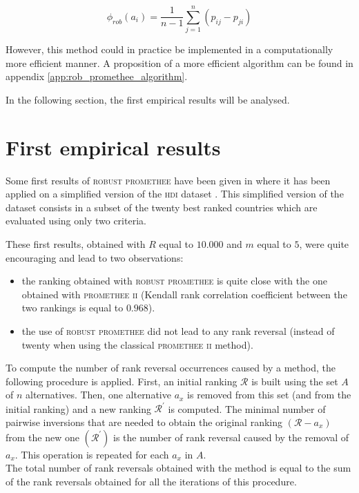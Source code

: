 \begin{equation}
    \phi_{rob}(a_i) = \frac{1}{n-1}\sum\limits^n_{j=1} (p_{ij} - p_{ji})
    \label{eqn:rob_phi}
\end{equation}

However, this method could in practice be implemented in a computationally more efficient manner. A proposition of a more efficient algorithm can be found in appendix \ref{app:rob_promethee_algorithm}.

In the following section, the first empirical results will be analysed.

\section{First empirical results} \label{sec:Robust_Promethee_empirical_results}

Some first results of \textsc{robust promethee} have been given in \cite{RobPII} where it has been applied on a simplified version of the \textsc{hdi} dataset \cite{HDI}.
This simplified version of the dataset consists in a subset of the twenty best ranked countries which are evaluated using only two criteria.

These first results, obtained with $R$ equal to $10.000$ and $m$ equal to $5$, were quite encouraging and lead to two observations:
\begin{itemize}
    \item the ranking obtained with \textsc{robust promethee} is quite close with the one obtained with \textsc{promethee ii} (Kendall rank correlation coefficient between the two rankings is equal to $0.968$).
    \item the use of \textsc{robust promethee}  did not lead to any rank reversal (instead of twenty when using the classical \textsc{promethee ii} method).
\end{itemize}

To compute the number of rank reversal occurrences caused by a method, the following procedure is applied.
First, an initial ranking $\mathcal{R}$ is built using the set $A$ of $n$ alternatives.
Then, one alternative $a_x$ is removed from this set (and from the initial ranking) and a new ranking $\mathcal{R}^\prime$ is computed.
The minimal number of pairwise inversions that are needed to obtain the original ranking $(\mathcal{R} -{a_x})$ from the new one $(\mathcal{R}^\prime)$ is the number of rank reversal caused by the removal of $a_x$.
This operation is repeated for each $a_x$ in $A$. \\
The total number of rank reversals obtained with the method is equal to the sum of the rank reversals obtained for all the iterations of this procedure.

